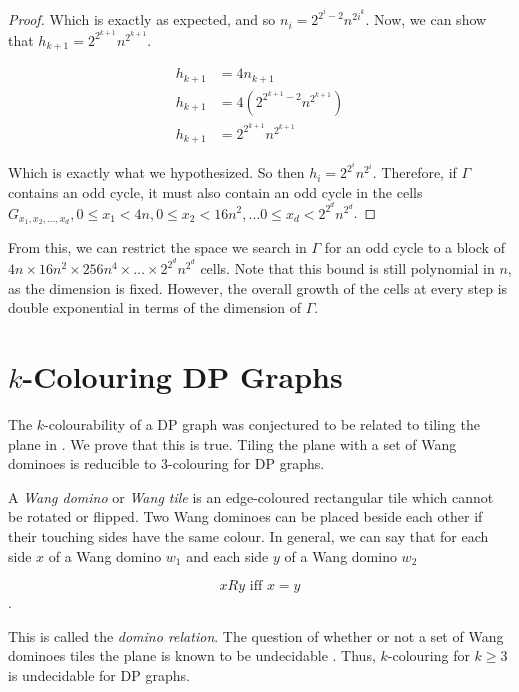 \documentclass[letterpaper]{article}
\begin{document}
\begin{proof}
Which is exactly as expected, and so $n_i = 2^{2^{i}-2} n^{2i^k}$.
Now, we can show that $h_{k+1} = 2^{2^{k+1}} n^{2^{k+1}}$.

\begin{align*}
h_{k+1} &= 4n_{k+1} \\
h_{k+1} &= 4(2^{2^{k+1} - 2} n^{2^{k+1}}) \\
h_{k+1} &= 2^{2^{k+1}} n^{2^{k+1}}
\end{align*}

Which is exactly what we hypothesized. So then $h_i = 2^{2^{i}} n^{2^{i}}$. Therefore, if $\Gamma$ contains an odd cycle, it
must also contain an odd cycle in the cells $G_{x_1,x_2,\ldots,x_d}, 0 \leq x_1 < 4n, 0 \leq x_2 < 16n^2, \ldots 0 \leq x_d < 2^{2^d} n^{2^d}$.
\end{proof}

From this, we can restrict the space we search in $\Gamma$ for an odd cycle to a block of $4n \times 16n^2 \times 256n^4 \times \ldots \times 2^{2^d} n^{2^d}$ cells. Note that this bound is still polynomial in $n$, as the dimension is fixed. However, the overall growth of the cells at every step is double exponential in terms of the dimension of $\Gamma$.

\section{$k$-Colouring DP Graphs}

The $k$-colourability of a DP graph was conjectured to be related to tiling the plane in \cite{bauslaugh05}.
We prove that this is true.
Tiling the plane with a set of Wang dominoes is reducible to 3-colouring for DP graphs.

A \emph{Wang domino} or \emph{Wang tile} is an edge-coloured rectangular tile which cannot be rotated or flipped.
Two Wang dominoes can be placed beside each other if their touching sides have the same colour.
In general, we can say that for each side $x$ of a Wang domino $w_1$ and each side $y$ of a Wang domino $w_2$

\[ x R y \text{ iff } x = y \].

This is called the \emph{domino relation}.
The question of whether or not a set of Wang dominoes tiles the plane is known to be undecidable \cite{berger1966}.
Thus, $k$-colouring for $k \geq 3$ is undecidable for DP graphs.
\end{document}
